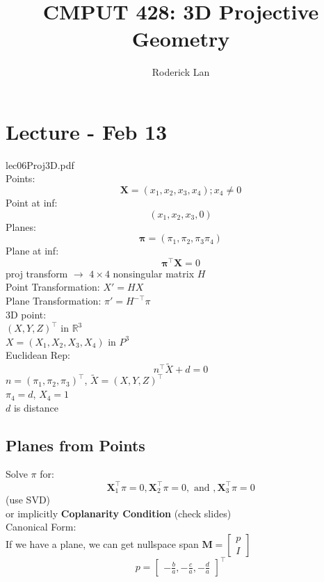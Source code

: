 \documentclass{article}
\title{CMPUT 428: 3D Projective Geometry}
\author{Roderick Lan}
\date{}
\begin{document}
\makeatother
{}

\maketitle
\tableofcontents
\break

\section{Lecture - Feb 13}
lec06Proj3D.pdf\\[5pt]
Points:
\[
  \mathbf X = (x_1, x_2, x_3, x_4); x_4 \ne 0
\]
Point at inf:
\[
  (x_1, x_2, x_3, 0)
\]
Planes:
\[
  \mathbf \pi = (\pi_1, \pi_2, \pi_3 \pi_4)
\]
Plane at inf:
\[
  \mathbf \pi^\top \mathbf X = 0
\]
proj transform $\to$ $4\times 4$ nonsingular matrix $H$\\
Point Transformation: $X' = HX$
\\
Plane Transformation: $\pi' =H^{-\top }\pi$
\\[5pt]
3D point:\\
$(X,Y,Z)^\top$ in $\mathbb R^3$
\\
$X = (X_1, X_2, X_3, X_4)$ in $P^3$
\\[5pt]
Euclidean Rep:
\[
  n^\top \tilde X + d = 0
\]
$
n = (\pi_1, \pi_2, \pi_3)^\top
$, $\tilde X = (X,Y,Z)^\top $
\\
$\pi_4 = d$, $X_4 = 1$
\\
$d$ is distance
\subsection{Planes from Points}
Solve $\pi$ for:
\[
  \mathbf X_1^\top \pi = 0, \mathbf X_2^\top \pi = 0, \text{ and }, \mathbf X_3^\top \pi = 0
\]
(use SVD)\\
or implicitly \textbf{Coplanarity Condition} (check slides)
\\[5pt]
Canonical Form:
\\
If we have a plane, we can get nullspace span $\mathbf M= \begin{bmatrix}
  p \\ I
\end{bmatrix}$ 
\[
  p = \begin{bmatrix}
    -\frac{b}{a}, -\frac{c}{a}, -\frac{d}{a}
  \end{bmatrix}^\top
\]
\end{document}
